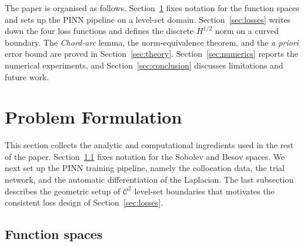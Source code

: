 \documentclass[11pt]{article}
\newcommand{\C}{\mathcal{C}}
\begin{document}
The paper is organised as follows. Section~\ref{sec:formulation}
fixes notation for the function spaces and sets up the PINN
pipeline on a level-set domain. Section~\ref{sec:losses} writes
down the four loss functions and defines the discrete $H^{1/2}$
norm on a curved boundary. The \textit{Chord-arc} lemma, the
norm-equivalence theorem, and the \emph{a priori} error bound are
proved in Section~\ref{sec:theory}. Section~\ref{sec:numerics}
reports the numerical experiments, and
Section~\ref{sec:conclusion} discusses limitations and future
work.


\section{Problem Formulation}
\label{sec:formulation}

This section collects the analytic and computational ingredients
used in the rest of the paper. Section~\ref{sec:functional} fixes
notation for the Sobolev and Besov spaces. We next set up the PINN
training pipeline, namely the collocation data, the trial network,
and the automatic differentiation of the Laplacian. The last
subsection describes the geometric setup of $\C^2$ level-set
boundaries that motivates the consistent loss design of
Section~\ref{sec:losses}.

\subsection{Function spaces}\label{sec:functional}
 
\end{document}
